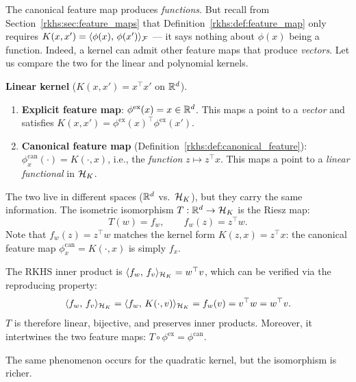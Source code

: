 \begin{notechapter}
\begin{insightbox}
The canonical feature map produces \emph{functions}.
But recall from Section~\ref{rkhs:sec:feature_maps} that
Definition~\ref{rkhs:def:feature_map} only requires
$K(x,x') = \langle \phi(x),\, \phi(x') \rangle_{\mathcal{F}}$
--- it says nothing about $\phi(x)$ being a function.
Indeed, a kernel can admit other feature maps that
produce \emph{vectors}. Let us compare the two for
the linear and polynomial kernels.

\medskip
\textbf{Linear kernel}
($K(x,x') = x^\top x'$ on $\mathbb{R}^d$).
\begin{enumerate}
  \item \textbf{Explicit feature map}:
    $\phi^{\mathrm{ex}}(x) = x \in \mathbb{R}^d$.
    This maps a point to a \emph{vector} and satisfies
    $K(x,x') = \phi^{\mathrm{ex}}(x)^\top
    \phi^{\mathrm{ex}}(x')$. \checkmark
  \item \textbf{Canonical feature map}
    (Definition~\ref{rkhs:def:canonical_feature}):
    $\phi_x^{\mathrm{can}}(\cdot) = K(\cdot,x)$,
    i.e., the \emph{function}
    $z \mapsto z^\top x$.
    This maps a point to a \emph{linear functional}
    in $\mathcal{H}_K$.
\end{enumerate}
The two live in different spaces ($\mathbb{R}^d$ vs.\
$\mathcal{H}_K$), but they carry the same information. The
isometric isomorphism $T: \mathbb{R}^d \to \mathcal{H}_K$ is the
Riesz map:
\[
T(w) = f_w, \qquad f_w(z) = z^\top w.
\]
Note that $f_w(z) = z^\top w$ matches the kernel form
$K(z,x) = z^\top x$: the canonical feature map
$\phi_x^{\mathrm{can}} = K(\cdot, x)$ is simply
$f_x$.

The RKHS inner product is
$\langle f_w,\, f_v \rangle_{\mathcal{H}_K} = w^\top v$, which can be
verified via the reproducing property:
\[
\langle f_w,\, f_v \rangle_{\mathcal{H}_K}
= \langle f_w,\, K(\cdot, v) \rangle_{\mathcal{H}_K}
= f_w(v) = v^\top w = w^\top v.
\]
$T$ is therefore linear, bijective, and preserves
inner products. Moreover, it intertwines the two
feature maps:
$T \circ \phi^{\mathrm{ex}} = \phi^{\mathrm{can}}$.
\end{insightbox}

\begin{insightbox}
The same phenomenon occurs for the quadratic kernel,
but the isomorphism is richer.


\end{insightbox}
\end{notechapter}
